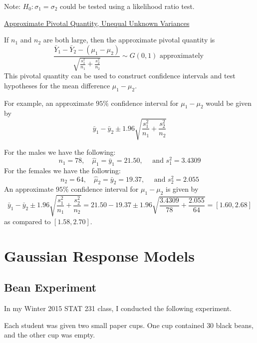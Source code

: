 Note: $ H_0:\sigma_1=\sigma_2 $ could be tested using a likelihood ratio test.

\underline{Approximate Pivotal Quantity, Unequal Unknown Variances}

If $ n_1 $ and $ n_2 $ are both large, then the approximate pivotal quantity is
\[\frac{\bar{Y}_{1}-\bar{Y}_{2}-\left(\mu_{1}-\mu_{2}\right)}{\sqrt{\frac{s_{1}^{2}}{n_{1}}+\frac{s_{2}^{2}}{n_{2}}}} \sim G(0,1) \text { approximately }\]
This pivotal quantity can be used to construct confidence intervals and test hypotheses for the
mean difference $ \mu_1-\mu_2 $.

\begin{exbox}
    \begin{example}
        For example, an approximate $ 95\% $ confidence interval for $ \mu_1-\mu_2 $ would be given
        by
        \[\bar{y}_{1}-\bar{y}_{2} \pm 1.96 \sqrt{\frac{s_{1}^{2}}{n_{1}}+\frac{s_{2}^{2}}{n_{2}}}\]
    \end{example}
\end{exbox}

\begin{exbox}
    \begin{example}
        For the males we have the following:
        \[n_{1}=78, \quad \hat{\mu}_{1}=\bar{y}_{1}=21.50, \quad \text { and } s_{1}^{2}=3.4309\]
        For the females we have the following:
        \[n_{2}=64, \quad \hat{\mu}_{2}=\bar{y}_{2}=19.37, \quad \text { and } s_{2}^{2}=2.055\]
        An approximate $ 95\% $ confidence interval for $ \mu_1-\mu_2 $ is given by
        \[\bar{y}_{1}-\bar{y}_{2} \pm 1.96 \sqrt{\frac{s_{1}^{2}}{n_{1}}+\frac{s_{2}^{2}}{n_{2}}}=21.50-19.37 \pm 1.96 \sqrt{\frac{3.4309}{78}+\frac{2.055}{64}}=[1.60,2.68]\]
        as compared to $ [1.58,2.70] $.
    \end{example}
\end{exbox}

\section{Gaussian Response Models}
\subsection{Bean Experiment}
In my Winter 2015 STAT 231 class, I conducted the following experiment.

Each student was given two small paper cups. One cup contained $30$ black beans, and
the other cup was empty.

